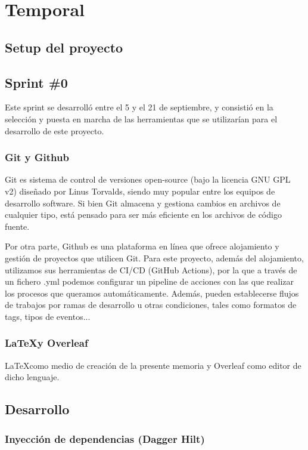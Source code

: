 \chapter{Temporal}
    \section{Setup del proyecto}
    
    \section{Sprint \#0}
        Este sprint se desarrolló entre el 5 y el 21 de septiembre, y consistió en la selección y puesta en marcha de las herramientas que se utilizarían para el desarrollo de este proyecto.  
        
        \subsection{Git y Github}
        
            Git es sistema de control de versiones open-source (bajo la licencia GNU GPL v2) diseñado por Linus Torvalds, siendo muy popular entre los equipos de desarrollo software. Si bien Git almacena y gestiona cambios en archivos de cualquier tipo, está pensado para ser más eficiente en los archivos de código fuente.
            
            Por otra parte, Github es una plataforma en línea que ofrece alojamiento y gestión de proyectos que utilicen Git. Para este proyecto, además del alojamiento, utilizamos sus herramientas de CI/CD (GitHub Actions), por la que a través de un fichero .yml podemos configurar un pipeline de acciones con las que realizar los procesos que queramos automáticamente. Además, pueden establecerse flujos de trabajos por ramas de desarrollo u otras condiciones, tales como formatos de tags, tipos de eventos...
            
        
        \subsection{\LaTeX y Overleaf}
        \LaTeX como medio de creación de la presente memoria y Overleaf como editor de dicho lenguaje.

    \section{Desarrollo}
        \subsection{Inyección de dependencias (Dagger Hilt)}
